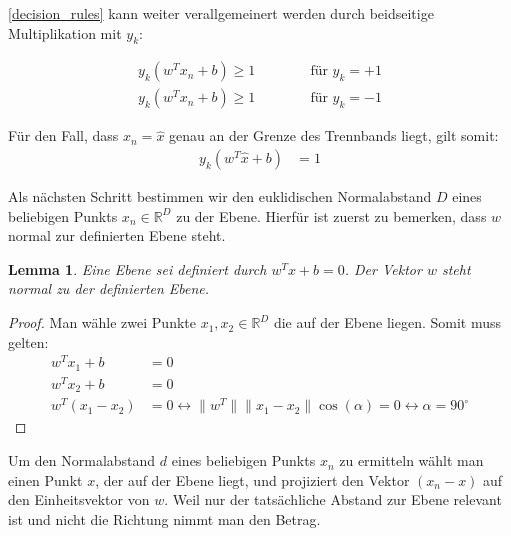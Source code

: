 \documentclass[a4paper,11pt,twoside]{scrreprt}
\newtheorem{lemma}[theorem]{Lemma}
\newcommand{\norm}[1]{\lVert#1\rVert}
\begin{document}
 \autoref{decision_rules} kann weiter verallgemeinert werden durch beidseitige Multiplikation mit $y_{k}$:

\begin{subequations} \label{decision_rules2}
	\begin{alignat}{2}
		y_{k} (w^{T} x_{n} + b) \geq 1 & \qquad & \text{ für } y_{k} = +1\\
		y_{k} (w^{T} x_{n} + b) \geq 1 & & \text{ für } y_{k} = -1
	\end{alignat}
\end{subequations}



Für den Fall, dass $x_{n} = \hat{x}$ genau an der Grenze des Trennbands liegt, gilt somit:
\begin{equation} \label{dec_rule}
	\begin{aligned}
		y_{k} (w^{T} \hat{x} + b) &= 1
	\end{aligned}
\end{equation}


Als nächsten Schritt bestimmen wir den euklidischen Normalabstand $D$ eines beliebigen Punkts $x_{n} \in \mathbb{R}^{D}$ zu der Ebene. Hierfür ist zuerst zu bemerken, dass $w$ normal zur definierten Ebene steht.

\begin{lemma}
	Eine Ebene sei definiert durch $w^{T} x + b = 0$. Der Vektor $w$ steht normal zu der definierten Ebene.
\end{lemma}

\begin{proof}
	Man wähle zwei Punkte $x_{1}, x_{2} \in \mathbb{R}^{D}$ die auf der Ebene liegen. Somit muss gelten:
	\begin{equation}
		\begin{aligned}
			w^{T} x_{1} + b &= 0 \\
			w^{T} x_{2} + b &= 0 \\
			w^{T} (x_{1} - x_{2}) &= 0 \leftrightarrow \norm{w^{T}} \norm{x_{1} - x_{2}} \cos(\alpha) = 0 \leftrightarrow \alpha = 90^{\circ}
		\end{aligned}
	\end{equation}
\end{proof}

Um den Normalabstand $d$ eines beliebigen Punkts $x_{n}$ zu ermitteln wählt man einen Punkt $x$, der auf der Ebene liegt, und projiziert den Vektor $(x_{n} - x)$ auf den Einheitsvektor von $w$. Weil nur der tatsächliche Abstand zur Ebene relevant ist und nicht die Richtung nimmt man den Betrag.
\end{document}

